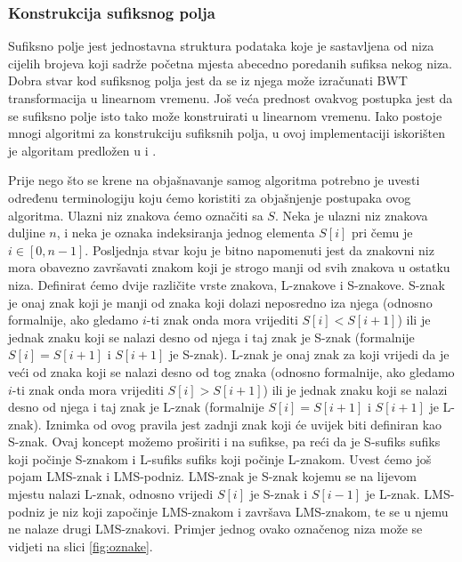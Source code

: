 \subsubsection{Konstrukcija sufiksnog polja}
Sufiksno polje jest jednostavna struktura podataka koje je sastavljena od niza cijelih brojeva koji sadrže početna mjesta abecedno poredanih sufiksa nekog niza. Dobra stvar kod sufiksnog polja jest da se iz njega može izračunati BWT transformacija u linearnom vremenu. Još veća prednost ovakvog postupka jest da se sufiksno polje isto tako može konstruirati u linearnom vremenu. Iako postoje mnogi algoritmi za konstrukciju sufiksnih polja, u ovoj implementaciji iskorišten je algoritam predložen u \cite{sais1} i \cite{sais2}. 

Prije nego što se krene na objašnavanje samog algoritma potrebno je uvesti određenu terminologiju koju ćemo koristiti za objašnjenje postupaka ovog algoritma. Ulazni niz znakova ćemo označiti sa $S$. Neka je ulazni niz znakova duljine $n$, i neka je oznaka indeksiranja jednog elementa $S[i]$ pri čemu je $i \in [0,n-1]$. Posljednja stvar koju je bitno napomenuti jest da znakovni niz mora obavezno završavati znakom koji je strogo manji od svih znakova u ostatku niza.  Definirat ćemo dvije različite vrste znakova, L-znakove i S-znakove. S-znak je onaj znak koji je manji od znaka koji dolazi neposredno iza njega (odnosno formalnije, ako gledamo $i$-ti znak onda mora vrijediti $S[i]<S[i+1]$) ili je jednak znaku koji se nalazi desno od njega i taj znak je S-znak (formalnije $S[i]=S[i+1]$ i $S[i+1]$ je S-znak). L-znak je onaj znak za koji vrijedi da je veći od znaka koji se nalazi desno od tog znaka (odnosno formalnije, ako gledamo $i$-ti znak onda mora vrijediti $S[i]>S[i+1]$) ili je jednak znaku koji se nalazi desno od njega i taj znak je L-znak (formalnije $S[i]=S[i+1]$ i $S[i+1]$ je L-znak). Iznimka od ovog pravila jest zadnji znak koji će uvijek biti definiran kao S-znak. Ovaj koncept možemo proširiti i na sufikse, pa reći da je S-sufiks sufiks koji počinje S-znakom i L-sufiks sufiks koji počinje L-znakom. Uvest ćemo još pojam LMS-znak i LMS-podniz. LMS-znak je S-znak kojemu se na lijevom mjestu nalazi L-znak, odnosno vrijedi $S[i]$ je S-znak i $S[i-1]$ je L-znak. LMS-podniz je niz koji započinje LMS-znakom i završava LMS-znakom, te se u njemu ne nalaze drugi LMS-znakovi. Primjer jednog ovako označenog niza može se vidjeti na slici \ref{fig:oznake}.

\\

